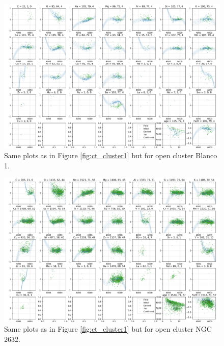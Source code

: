 \begin{figure}
	\centering
	\includegraphics[width=\textwidth]{p_teff_abundances_Blanco_1_orbits_DR3_new_flag0.png}
	\caption{Same plots as in Figure \ref{fig:ct_cluster1} but for open cluster Blanco 1.}
	\label{fig:ct_cluster2}
\end{figure}

\begin{figure}
	\centering
	\includegraphics[width=\textwidth]{p_teff_abundances_NGC_2632_orbits_DR3_new_flag0.png}
	\caption{Same plots as in Figure \ref{fig:ct_cluster1} but for open cluster NGC 2632.}
	\label{fig:ct_cluster3}
\end{figure}

